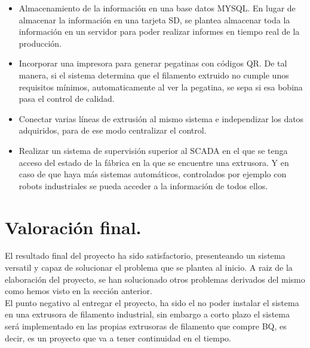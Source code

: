\begin{itemize}
	\item{Almacenamiento de la información en una base datos MYSQL. En lugar de almacenar la información en una tarjeta SD, se plantea almacenar toda la información en un servidor para poder realizar informes en tiempo real de la producción.}
	\item{Incorporar una impresora para generar pegatinas con códigos QR. De tal manera, si el sistema determina que el filamento extruido no cumple unos requisitos mínimos, automaticamente al ver la pegatina, se sepa si esa bobina pasa el control de calidad.}
	\item{Conectar varias líneas de extrusión al mismo sistema e independizar los datos adquiridos, para de ese modo centralizar el control.}
	\item{Realizar un sistema de supervisión superior al SCADA en el que se tenga acceso del estado de la fábrica en la que se encuentre una extrusora. Y en caso de que haya más sistemas automáticos, controlados por ejemplo con robots industriales se pueda acceder a la información de todos ellos.}

\end{itemize}

\section{Valoración final.}

El resultado final del proyecto ha sido satisfactorio, presenteando un sistema versatil y capaz de solucionar el problema que se plantea al inicio. A raiz de la elaboración del proyecto, se han solucionado otros problemas derivados del mismo como hemos visto en la sección anterior.\\

El punto negativo al entregar el proyecto, ha sido el no poder instalar el sistema en una extrusora de filamento industrial, sin embargo a corto plazo el sistema será implementado en las propias extrusoras de filamento que compre BQ, es decir, es un proyecto que va a tener continuidad en el tiempo.

